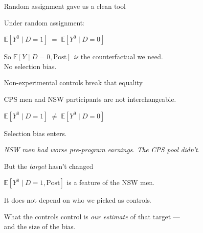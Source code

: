 \documentclass[11pt,aspectratio=169]{beamer}
\begin{document}
\begin{frame}{Random assignment gave us a clean tool}
\vspace{1.4em}
\begin{center}
\large
Under random assignment:
\end{center}
\vspace{0.4em}
\begin{center}
\Large
$\mathbb{E}[Y^0 \mid D{=}1] \;=\; \mathbb{E}[Y^0 \mid D{=}0]$
\end{center}
\vspace{1em}
\begin{center}
So $\mathbb{E}[Y \mid D{=}0, \text{Post}]$ \textit{is} the counterfactual we need. \\[0.2em]
No selection bias.
\end{center}
\end{frame}

\begin{frame}{Non-experimental controls break that equality}
\vspace{1em}
\begin{center}
\large
CPS men and NSW participants are not interchangeable.
\end{center}
\vspace{0.6em}
\begin{center}
\large
$\mathbb{E}[Y^0 \mid D{=}1] \;\neq\; \mathbb{E}[Y^0 \mid D{=}0]$
\end{center}
\vspace{1em}
\begin{center}
\large
Selection bias enters.
\end{center}
\vspace{0.6em}
\begin{center}
\small\color{warmgray}\itshape
NSW men had worse pre-program earnings. \;The CPS pool didn't.
\end{center}
\end{frame}

\begin{frame}{But the \textit{target} hasn't changed}
\vspace{1.2em}
\begin{center}
\large
$\mathbb{E}[Y^0 \mid D{=}1, \text{Post}]$ is a feature of the NSW men.
\end{center}
\vspace{0.6em}
\begin{center}
\large
It does not depend on who we picked as controls.
\end{center}
\vspace{1em}
\begin{center}
\large
What the controls control is \textit{our estimate} of that target --- \\[0.2em] and the size of the bias.
\end{center}
\end{frame}
\end{document}

